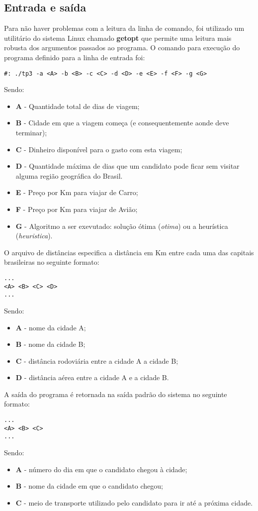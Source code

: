 \documentclass[12pt]{article}
\begin{document}
\subsection{Entrada e saída}
Para não haver problemas com a leitura da linha de comando, foi utilizado um utilitário do
sistema Linux chamado \textbf{getopt} que permite uma leitura mais robusta dos argumentos
passados ao programa. O comando para execução do programa definido para a linha de entrada 
foi:
\begin{verbatim}
#: ./tp3 -a <A> -b <B> -c <C> -d <D> -e <E> -f <F> -g <G> 
\end{verbatim}
Sendo: 
\begin{itemize}
  \item \textbf{A} - Quantidade total de dias de viagem;
  \item \textbf{B} - Cidade em que a viagem começa (e consequentemente aonde deve terminar);
  \item \textbf{C} - Dinheiro disponível para o gasto com esta viagem;
  \item \textbf{D} - Quantidade máxima de dias que um candidato pode ficar sem visitar alguma
  região geográfica do Brasil.
  \item \textbf{E} - Preço por Km para viajar de Carro;
  \item \textbf{F} - Preço por Km para viajar de Avião; 
  \item \textbf{G} - Algoritmo a ser exevutado: solução ótima (\textit{otima}) ou a 
  heurística (\textit{heuristica}).
\end{itemize}

O arquivo de distâncias especifica a distância em Km entre cada uma das capitais brasileiras
no seguinte formato:
\begin{verbatim}
...
<A> <B> <C> <D>
...
\end{verbatim}
Sendo:
\begin{itemize}
  \item \textbf{A} - nome da cidade A;
  \item \textbf{B} - nome da cidade B; 
  \item \textbf{C} - distância rodoviária entre a cidade A a cidade B;
  \item \textbf{D} - distância aérea entre a cidade A e a cidade B. 
\end{itemize}

A saída do programa é retornada na saída padrão do sistema no seguinte formato:
\begin{verbatim}
...
<A> <B> <C>
...
\end{verbatim}
Sendo:
\begin{itemize}
  \item \textbf{A} - número do dia em que o candidato chegou à cidade;
  \item \textbf{B} - nome da cidade em que o candidato chegou; 
  \item \textbf{C} - meio de transporte utilizado pelo candidato para ir até a próxima cidade.
\end{itemize}
\end{document}
